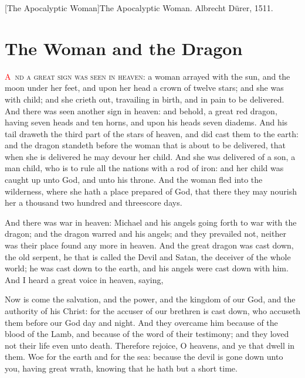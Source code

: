 [The Apocalyptic Woman]{The Apocalyptic Woman. Albrecht Dürer, 1511.}

\chapter{The Woman and the Dragon}
\lettrine[lines=3,slope=0.5em]{\textcolor{red}{A}}{\ nd a great sign was seen in heaven}:%
 a woman arrayed with the sun, and the moon under her feet, and upon her head a crown of twelve stars; 
 and she was with child; and she crieth out, travailing in birth, and in pain to be delivered. 
 And there was seen another sign in heaven: and behold, a great red dragon, having seven heads and ten horns, and upon his heads seven diadems. 
 And his tail draweth the third part of the stars of heaven, and did cast them to the earth: and the dragon standeth before the woman that is about to be delivered, that when she is delivered he may devour her child. 
 And she was delivered of a son, a man child, who is to rule all the nations with a rod of iron: and her child was caught up unto God, and unto his throne. 
 And the woman fled into the wilderness, where she hath a place prepared of God, that there they may nourish her a thousand two hundred and threescore days.

 And there was war in heaven: Michael and his angels going forth to war with the dragon; and the dragon warred and his angels; 
 and they prevailed not, neither was their place found any more in heaven. 
 And the great dragon was cast down, the old serpent, he that is called the Devil and Satan, the deceiver of the whole world; he was cast down to the earth, and his angels were cast down with him. 
 And I heard a great voice in heaven, saying,

Now is come the salvation, and the power, and the kingdom of our God, and the authority of his Christ: for the accuser of our brethren is cast down, who accuseth them before our God day and night. 
 And they overcame him because of the blood of the Lamb, and because of the word of their testimony; and they loved not their life even unto death. 
 Therefore rejoice, O heavens, and ye that dwell in them. Woe for the earth and for the sea: because the devil is gone down unto you, having great wrath, knowing that he hath but a short time.


